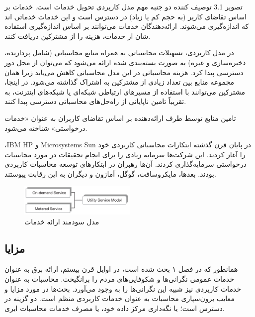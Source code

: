 \documentclass{book}
\begin{document}
            تصویر 3.1 توصیف کننده دو جنبه مهم مدل کاربردی تحویل خدمات است. خدمات بر اساس تقاضای کاربر (به حجم کم یا زیاد) در دسترس است و این خدمات خدماتی اند که اندازه‌گیری می‌شوند. ارائه‌دهندگان خدمات می‌توانند بر اساس اندازه‌گیری استفاده شان از خدمات، هزینه را از مشترکین دریافت کنند.

            در مدل کاربردی، تسهیلات محاسباتی به همراه منابع محاسباتی (شامل پردازنده، ذخیره‌سازی و غیره) به صورت بسته‌بندی شده ارائه می‌شود که می‌توان از محل دور دسترسی پیدا کرد. هزینه محاسباتی در این مدل محاسباتی کاهش می‌یابد زیرا همان مجموعه منابع بین تعداد زیادی از مشترکین به اشتراک گذاشته می‌شود. در اینجا، مشترکین می‌توانند با استفاده از مسیرهای ارتباطی شبکه‌ای یا شبکه‌های اینترنت، به تقریباً تامین ناپایانی از راه‌حل‌های محاسباتی دسترسی پیدا کنند.

            \begin{addinfo}
                
                تامین منابع توسط طرف ارائه‌دهنده بر اساس تقاضای کاربران به عنوان «خدمات درخواستی» شناخته می‌شود.

            \end{addinfo}

            ،IBM HP و Microsystems Sun در پایان قرن گذشته ابتکارات محاسباتی کاربردی خود را آغاز کردند. این شرکت‌ها سرمایه زیادی را برای انجام تحقیقات در مورد محاسبات درخواستی سرمایه‌گذاری کردند. آن‌ها رهبران در ابتکارهای توسعه محاسبات کاربردی بودند. بعدها، مایکروسافت، گوگل، آمازون و دیگران به این رقابت پیوستند.

            \begin{figure}[htbp]

                \centering
                \includegraphics[width=0.5\textwidth]{image/fig 3.1.png}
                \caption{مدل سودمند ارائه خدمات}
                \label{fig:fig_3.1}
        
            \end{figure}

            \subsection{مزایا}

                همانطور که در فصل ۱ بحث شده است، در اوایل قرن بیستم، ارائه برق به عنوان خدمات عمومی نگرانی‌ها و شکوفایی‌های مردم را برانگیخت. محاسبات به عنوان خدمات کاربردی نیز شبیه این نگرانی‌ها را به وجود می‌آورد. بحث‌ها در مورد مزایا و معایب برون‌سپاری محاسبات به عنوان خدمات کاربردی منظم است. دو گزینه در دسترس است؛ یا نگه‌داری مرکز داده خود، یا مصرف خدمات محاسبات ابری.
\end{document}
